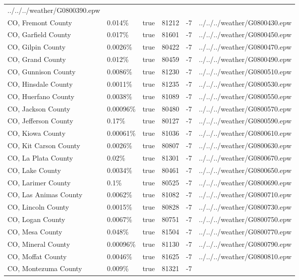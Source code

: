 \begin{longtable}[]{@{}llllll@{}}
../../../weather/G0800390.epw \\
CO, Fremont County & 0.014\% & true & 81212 & -7 &
../../../weather/G0800430.epw \\
CO, Garfield County & 0.017\% & true & 81601 & -7 &
../../../weather/G0800450.epw \\
CO, Gilpin County & 0.0026\% & true & 80422 & -7 &
../../../weather/G0800470.epw \\
CO, Grand County & 0.012\% & true & 80459 & -7 &
../../../weather/G0800490.epw \\
CO, Gunnison County & 0.0086\% & true & 81230 & -7 &
../../../weather/G0800510.epw \\
CO, Hinsdale County & 0.0011\% & true & 81235 & -7 &
../../../weather/G0800530.epw \\
CO, Huerfano County & 0.0038\% & true & 81089 & -7 &
../../../weather/G0800550.epw \\
CO, Jackson County & 0.00096\% & true & 80480 & -7 &
../../../weather/G0800570.epw \\
CO, Jefferson County & 0.17\% & true & 80127 & -7 &
../../../weather/G0800590.epw \\
CO, Kiowa County & 0.00061\% & true & 81036 & -7 &
../../../weather/G0800610.epw \\
CO, Kit Carson County & 0.0026\% & true & 80807 & -7 &
../../../weather/G0800630.epw \\
CO, La Plata County & 0.02\% & true & 81301 & -7 &
../../../weather/G0800670.epw \\
CO, Lake County & 0.0034\% & true & 80461 & -7 &
../../../weather/G0800650.epw \\
CO, Larimer County & 0.1\% & true & 80525 & -7 &
../../../weather/G0800690.epw \\
CO, Las Animas County & 0.0062\% & true & 81082 & -7 &
../../../weather/G0800710.epw \\
CO, Lincoln County & 0.0015\% & true & 80828 & -7 &
../../../weather/G0800730.epw \\
CO, Logan County & 0.0067\% & true & 80751 & -7 &
../../../weather/G0800750.epw \\
CO, Mesa County & 0.048\% & true & 81504 & -7 &
../../../weather/G0800770.epw \\
CO, Mineral County & 0.00096\% & true & 81130 & -7 &
../../../weather/G0800790.epw \\
CO, Moffat County & 0.0046\% & true & 81625 & -7 &
../../../weather/G0800810.epw \\
CO, Montezuma County & 0.009\% & true & 81321 & -7 &

\end{longtable}
